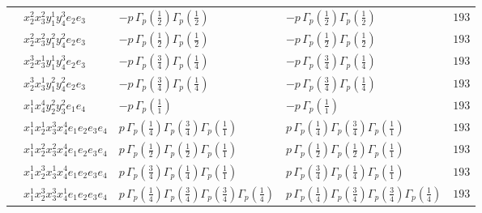 \documentclass[11pt]{article}
\begin{document}
\begin{table}[ht]
{\begin{tabular}{@{}lllll@{}}
 & $x_{2}^{2} x_{3}^{2} y_{1}^{1} y_{4}^{3} e_{2} e_{3}$ & $- p \, \Gamma_p \left( \frac{1}{2} \right) \Gamma_p \left( \frac{1}{2} \right)$ & $- p \, \Gamma_p \left( \frac{1}{2} \right) \Gamma_p \left( \frac{1}{2} \right)$ & $193$ \\
 & $x_{2}^{2} x_{3}^{2} y_{1}^{2} y_{4}^{2} e_{2} e_{3}$ & $- p \, \Gamma_p \left( \frac{1}{2} \right) \Gamma_p \left( \frac{1}{2} \right)$ & $- p \, \Gamma_p \left( \frac{1}{2} \right) \Gamma_p \left( \frac{1}{2} \right)$ & $193$ \\
 & $x_{2}^{3} x_{3}^{1} y_{1}^{1} y_{4}^{3} e_{2} e_{3}$ & $- p \, \Gamma_p \left( \frac{3}{4} \right) \Gamma_p \left( \frac{1}{4} \right)$ & $- p \, \Gamma_p \left( \frac{3}{4} \right) \Gamma_p \left( \frac{1}{4} \right)$ & $193$ \\
 & $x_{2}^{3} x_{3}^{1} y_{1}^{2} y_{4}^{2} e_{2} e_{3}$ & $- p \, \Gamma_p \left( \frac{3}{4} \right) \Gamma_p \left( \frac{1}{4} \right)$ & $- p \, \Gamma_p \left( \frac{3}{4} \right) \Gamma_p \left( \frac{1}{4} \right)$ & $193$ \\
 & $x_{1}^{1} x_{4}^{4} y_{2}^{2} y_{3}^{2} e_{1} e_{4}$ & $- p \, \Gamma_p \left( \frac{1}{1} \right)$ & $- p \, \Gamma_p \left( \frac{1}{1} \right)$ & $193$ \\
 & $x_{1}^{1} x_{2}^{1} x_{3}^{3} x_{4}^{4}  e_{1} e_{2} e_{3} e_{4}$ & $p \, \Gamma_p \left( \frac{1}{4} \right) \Gamma_p \left( \frac{3}{4} \right) \Gamma_p \left( \frac{1}{1} \right)$ & $p \, \Gamma_p \left( \frac{1}{4} \right) \Gamma_p \left( \frac{3}{4} \right) \Gamma_p \left( \frac{1}{1} \right)$ & $193$ \\
 & $x_{1}^{1} x_{2}^{2} x_{3}^{2} x_{4}^{4}  e_{1} e_{2} e_{3} e_{4}$ & $p \, \Gamma_p \left( \frac{1}{2} \right) \Gamma_p \left( \frac{1}{2} \right) \Gamma_p \left( \frac{1}{1} \right)$ & $p \, \Gamma_p \left( \frac{1}{2} \right) \Gamma_p \left( \frac{1}{2} \right) \Gamma_p \left( \frac{1}{1} \right)$ & $193$ \\
 & $x_{1}^{1} x_{2}^{3} x_{3}^{1} x_{4}^{4}  e_{1} e_{2} e_{3} e_{4}$ & $p \, \Gamma_p \left( \frac{3}{4} \right) \Gamma_p \left( \frac{1}{4} \right) \Gamma_p \left( \frac{1}{1} \right)$ & $p \, \Gamma_p \left( \frac{3}{4} \right) \Gamma_p \left( \frac{1}{4} \right) \Gamma_p \left( \frac{1}{1} \right)$ & $193$ \\
 & $x_{1}^{1} x_{2}^{3} x_{3}^{3} x_{4}^{1}  e_{1} e_{2} e_{3} e_{4}$ & $p \, \Gamma_p \left( \frac{1}{4} \right) \Gamma_p \left( \frac{3}{4} \right) \Gamma_p \left( \frac{3}{4} \right) \Gamma_p \left( \frac{1}{4} \right)$ & $p \, \Gamma_p \left( \frac{1}{4} \right) \Gamma_p \left( \frac{3}{4} \right) \Gamma_p \left( \frac{3}{4} \right) \Gamma_p \left( \frac{1}{4} \right)$ & $193$ \\

\end{tabular}}
\end{table}
\end{document}
